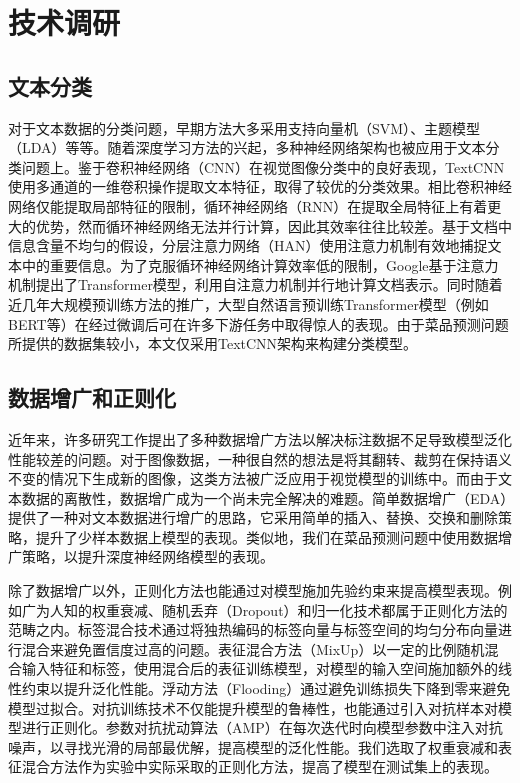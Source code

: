 \section{技术调研}

\subsection{文本分类}

对于文本数据的分类问题，早期方法大多采用支持向量机（SVM）\cite{cortes1995support}、主题模型（LDA）\cite{blei2003latent}等等。随着深度学习方法的兴起，多种神经网络架构也被应用于文本分类问题上。鉴于卷积神经网络（CNN）在视觉图像分类中的良好表现，TextCNN\cite{kim2014convolutional}使用多通道的一维卷积操作提取文本特征，取得了较优的分类效果。相比卷积神经网络仅能提取局部特征的限制，循环神经网络（RNN）\cite{chung2014empirical}在提取全局特征上有着更大的优势，然而循环神经网络无法并行计算，因此其效率往往比较差。基于文档中信息含量不均匀的假设，分层注意力网络（HAN）\cite{yang2016hierarchical}使用注意力机制有效地捕捉文本中的重要信息。为了克服循环神经网络计算效率低的限制，Google基于注意力机制提出了Transformer模型\cite{vaswani2017attention}，利用自注意力机制并行地计算文档表示。同时随着近几年大规模预训练方法的推广，大型自然语言预训练Transformer模型（例如BERT\cite{devlin2019bert}等）在经过微调后可在许多下游任务中取得惊人的表现。由于菜品预测问题所提供的数据集较小，本文仅采用TextCNN架构来构建分类模型。

\subsection{数据增广和正则化}

近年来，许多研究工作提出了多种数据增广方法以解决标注数据不足导致模型泛化性能较差的问题。对于图像数据，一种很自然的想法是将其翻转、裁剪在保持语义不变的情况下生成新的图像，这类方法被广泛应用于视觉模型的训练中\cite{krizhevsky2012imagenet}。而由于文本数据的离散性，数据增广成为一个尚未完全解决的难题。简单数据增广（EDA）\cite{wei2019eda}提供了一种对文本数据进行增广的思路，它采用简单的插入、替换、交换和删除策略，提升了少样本数据上模型的表现。类似地，我们在菜品预测问题中使用数据增广策略，以提升深度神经网络模型的表现。

除了数据增广以外，正则化方法也能通过对模型施加先验约束来提高模型表现。例如广为人知的权重衰减\cite{krogh1992simple}、随机丢弃（Dropout）\cite{srivastava2014dropout}和归一化技术\cite{ba2016layer}都属于正则化方法的范畴之内。标签混合技术\cite{szegedy2016rethinking}通过将独热编码的标签向量与标签空间的均匀分布向量进行混合来避免置信度过高的问题。表征混合方法（MixUp）\cite{zhang2018mixup}以一定的比例随机混合输入特征和标签，使用混合后的表征训练模型，对模型的输入空间施加额外的线性约束以提升泛化性能。浮动方法（Flooding）\cite{ishida2020we}通过避免训练损失下降到零来避免模型过拟合。对抗训练技术\cite{goodfellow2015explaining}不仅能提升模型的鲁棒性，也能通过引入对抗样本对模型进行正则化。参数对抗扰动算法（AMP）\cite{zheng2021regularizing}在每次迭代时向模型参数中注入对抗噪声，以寻找光滑的局部最优解，提高模型的泛化性能。我们选取了权重衰减和表征混合方法作为实验中实际采取的正则化方法，提高了模型在测试集上的表现。

